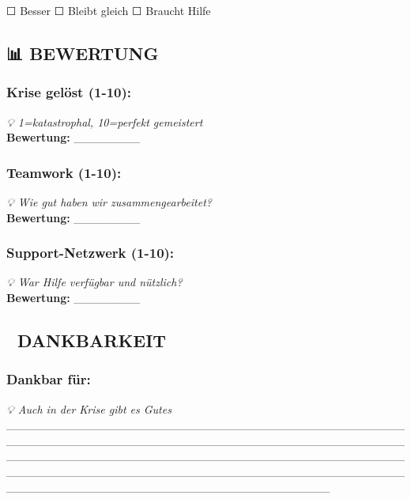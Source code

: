 ☐ Besser ☐ Bleibt gleich ☐ Braucht Hilfe

\hypertarget{bewertung}{%
\subsection{\texorpdfstring{\textbf{📊 BEWERTUNG}}{📊 BEWERTUNG}}\label{bewertung}}

\hypertarget{krise-geluxf6st-1-10}{%
\subsubsection{\texorpdfstring{\textbf{Krise gelöst (1-10):}}{Krise gelöst (1-10):}}\label{krise-geluxf6st-1-10}}

\emph{💡 1=katastrophal, 10=perfekt gemeistert}\\
\textbf{Bewertung:} \_\_\_\_\_\_\_\_

\hypertarget{teamwork-1-10}{%
\subsubsection{\texorpdfstring{\textbf{Teamwork (1-10):}}{Teamwork (1-10):}}\label{teamwork-1-10}}

\emph{💡 Wie gut haben wir zusammengearbeitet?}\\
\textbf{Bewertung:} \_\_\_\_\_\_\_\_

\hypertarget{support-netzwerk-1-10}{%
\subsubsection{\texorpdfstring{\textbf{Support-Netzwerk (1-10):}}{Support-Netzwerk (1-10):}}\label{support-netzwerk-1-10}}

\emph{💡 War Hilfe verfügbar und nützlich?}\\
\textbf{Bewertung:} \_\_\_\_\_\_\_\_

\hypertarget{dankbarkeit}{%
\subsection{\texorpdfstring{\textbf{💝 DANKBARKEIT}}{💝 DANKBARKEIT}}\label{dankbarkeit}}

\hypertarget{dankbar-fuxfcr}{%
\subsubsection{\texorpdfstring{\textbf{Dankbar für:}}{Dankbar für:}}\label{dankbar-fuxfcr}}

\emph{💡 Auch in der Krise gibt es Gutes} \_\_\_\_\_\_\_\_\_\_\_\_\_\_\_\_\_\_\_\_\_\_\_\_\_\_\_\_\_\_\_\_\_\_\_\_\_\_\_\_\_\_\_\_\_\_\_\_\_\_\_\_\_\_\_\_\_\_\_\_\_\_\_\_\_\_\_\_\_\_\_\_\_\_\_\_\_\_\_\_\_\_\_\_\_\_\_\_\_\_\_\_\_\_\_\_\_\_\_\_\_\_\_\_\_\_\_\_\_\_\_\_\_\_\_\_\_\_\_\_\_\_\_\_\_\_\_\_\_\_\_\_\_\_\_\_\_\_\_\_\_\_\_\_\_\_\_\_\_\_\_\_\_\_\_\_\_\_\_\_\_\_\_\_\_\_\_\_\_\_\_\_\_\_\_\_\_\_\_\_\_\_\_\_\_\_\_\_\_\_\_\_\_\_\_\_\_\_\_\_\_\_\_\_\_\_\_\_\_\_\_\_\_\_\_\_\_\_\_\_\_\_\_\_\_\_\_\_\_\_\_

